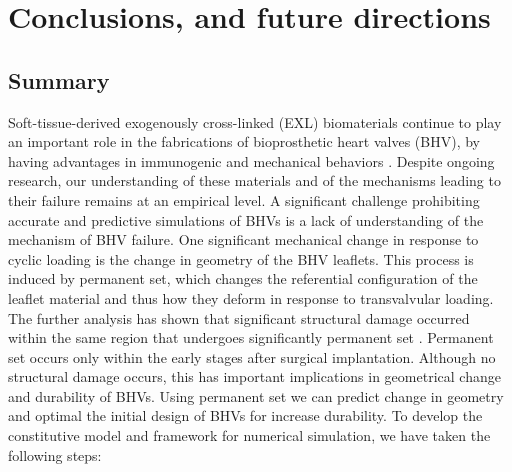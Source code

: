 \chapter{Conclusions, and future directions}

\section{Summary}
    
    Soft-tissue-derived exogenously cross-linked (EXL) biomaterials continue to play an important role in the fabrications of bioprosthetic heart valves (BHV), by having advantages in immunogenic and mechanical behaviors \cite{starr_artificial_2007}. Despite ongoing research, our understanding of these materials and of the mechanisms leading to their failure remains at an empirical level. A significant challenge prohibiting accurate and predictive simulations of BHVs is a lack of understanding of the mechanism of BHV failure. One significant mechanical change in response to cyclic loading is the change in geometry of the BHV leaflets. This process is induced by permanent set, which changes the referential configuration of the leaflet material and thus how they deform in response to transvalvular loading. The further analysis has shown that significant structural damage occurred within the same region that undergoes significantly permanent set \cite{smith_fatigue_1999}. Permanent set occurs only within the early stages after surgical implantation. Although no structural damage occurs, this has important implications in geometrical change and durability of BHVs. Using permanent set we can predict change in geometry and optimal the initial design of BHVs for increase durability. To develop the constitutive model and framework for numerical simulation, we have taken the following steps:
    
